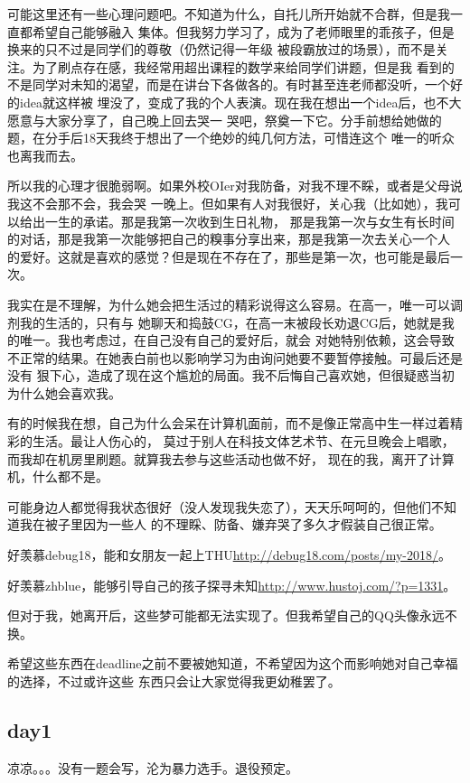 可能这里还有一些心理问题吧。不知道为什么，自托儿所开始就不合群，但是我一直都希望自己能够融入
集体。但我努力学习了，成为了老师眼里的乖孩子，但是换来的只不过是同学们的尊敬（仍然记得一年级
被段霸放过的场景），而不是关注。为了刷点存在感，我经常用超出课程的数学来给同学们讲题，但是我
看到的不是同学对未知的渴望，而是在讲台下各做各的。有时甚至连老师都没听，一个好的idea就这样被
埋没了，变成了我的个人表演。现在我在想出一个idea后，也不大愿意与大家分享了，自己晚上回去哭一
哭吧，祭奠一下它。分手前想给她做的题，在分手后18天我终于想出了一个绝妙的纯几何方法，可惜连这个
唯一的听众也离我而去。

所以我的心理才很脆弱啊。如果外校OIer对我防备，对我不理不睬，或者是父母说我这不会那不会，我会哭
一晚上。但如果有人对我很好，关心我（比如她），我可以给出一生的承诺。那是我第一次收到生日礼物，
那是我第一次与女生有长时间的对话，那是我第一次能够把自己的糗事分享出来，那是我第一次去关心一个人
的爱好。这就是喜欢的感觉？但是现在不存在了，那些是第一次，也可能是最后一次。

我实在是不理解，为什么她会把生活过的精彩说得这么容易。在高一，唯一可以调剂我的生活的，只有与
她聊天和捣鼓CG，在高一末被段长劝退CG后，她就是我的唯一。我也考虑过，在自己没有自己的爱好后，就会
对她特别依赖，这会导致不正常的结果。在她表白前也以影响学习为由询问她要不要暂停接触。可最后还是没有
狠下心，造成了现在这个尴尬的局面。我不后悔自己喜欢她，但很疑惑当初为什么她会喜欢我。

有的时候我在想，自己为什么会呆在计算机面前，而不是像正常高中生一样过着精彩的生活。最让人伤心的，
莫过于别人在科技文体艺术节、在元旦晚会上唱歌，而我却在机房里刷题。就算我去参与这些活动也做不好，
现在的我，离开了计算机，什么都不是。

可能身边人都觉得我状态很好（没人发现我失恋了），天天乐呵呵的，但他们不知道我在被子里因为一些人
的不理睬、防备、嫌弃哭了多久才假装自己很正常。

好羡慕debug18，能和女朋友一起上THU\url{http://debug18.com/posts/my-2018/}。

好羡慕zhblue，能够引导自己的孩子探寻未知\url{http://www.hustoj.com/?p=1331}。

但对于我，她离开后，这些梦可能都无法实现了。但我希望自己的QQ头像永远不换。

希望这些东西在deadline之前不要被她知道，不希望因为这个而影响她对自己幸福的选择，不过或许这些
东西只会让大家觉得我更幼稚罢了。

\subsection{day1}
凉凉。。。没有一题会写，沦为暴力选手。退役预定。

